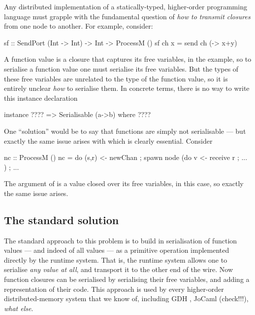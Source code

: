 \documentclass[preprint]{sigplanconf}
\begin{document}
Any distributed implementation of a statically-typed, 
higher-order programming language must
grapple with the fundamental question of \emph{how to transmit closures} from
one node to another.  For example, consider:
\begin{code}
  sf :: SendPort (Int -> Int) -> Int -> ProcessM ()
  sf ch x = send ch (\y -> x+y)
\end{code}
A function value is a closure that captures its free variables,
 in the example, so to serialise a function value
one must serialise its free variables.  But the types of
these free variables are unrelated to the type of the function
value, so it is entirely unclear \emph{how} to serialise them.
In concrete terms, there is no way to write this instance
declaration
\begin{code}
  instance ???? => Serialisable (a->b) where ????
\end{code}
One ``solution'' would be to say that functions are simply not
serialisable --- but exactly the same issue arises with 
which is clearly essential.  Consider
\begin{code}
  nc :: ProcessM ()
  nc = do { (s,r) <- newChan
          ; spawn node (do { v <- receive r
                           ; ... })
          ; ... }
\end{code}
The  argument of  is a value closed over
its free variables,  in this case, so exactly the same issue
arises.

\subsection{The standard solution}

The standard approach to this problem is to build in serialisation of
function values --- and indeed of all values --- as a primitive operation
implemented directly by the runtime system.  That is, the runtime system
allows one to serialise \emph{any value at all}, and transport it to the 
other end of the wire.  Now function closures can be serialised by
serialising their free variables, and adding a representation of their code.
This approach is used by every higher-order distributed-memory 
system that we know of, including GDH \cite{GDH}, JoCaml (check!!!), \emph{what else}.
\end{document}
